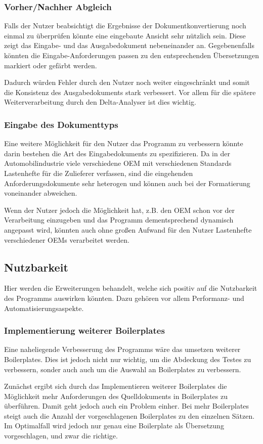 \documentclass[12pt]{report}
\begin{document}
\subsubsection{Vorher/Nachher Abgleich}
Falls der Nutzer beabsichtigt die Ergebnisse der Dokumentkonvertierung noch einmal zu überprüfen könnte eine eingebaute Ansicht sehr nützlich sein. Diese zeigt das Eingabe- und das Ausgabedokument nebeneinander an. Gegebenenfalls könnten die Eingabe-Anforderungen passen zu den entsprechenden Übersetzungen markiert oder gefärbt werden. 

Dadurch würden Fehler durch den Nutzer noch weiter eingeschränkt und somit die Konsistenz des Ausgabedokuments stark verbessert. Vor allem für die spätere Weiterverarbeitung durch den Delta-Analyser ist dies wichtig. 

\subsubsection{Eingabe des Dokumenttyps}
Eine weitere Möglichkeit für den Nutzer das Programm zu verbessern könnte darin bestehen die Art des Eingabedokuments zu spezifizieren. Da in der Automobilindustrie viele verschiedene OEM mit verschiedenen Standards Lastenhefte für die Zulieferer verfassen, sind die eingehenden Anforderungsdokumente sehr heterogen und können auch bei der Formatierung voneinander abweichen. 

Wenn der Nutzer jedoch die Möglichkeit hat, z.B. den OEM schon vor der Verarbeitung einzugeben und das Programm dementsprechend dynamisch angepasst wird, könnten auch ohne großen Aufwand für den Nutzer Lastenhefte verschiedener OEMs verarbeitet werden. 

\subsection{Nutzbarkeit}
Hier werden die Erweiterungen behandelt, welche sich positiv auf die Nutzbarkeit des Programms auswirken könnten. Dazu gehören vor allem Performanz- und Automatisierungsaspekte.
\subsubsection{Implementierung weiterer Boilerplates}
Eine naheliegende Verbesserung des Programms wäre das umsetzen weiterer Boilerplates. Dies ist jedoch nicht nur wichtig, um die Abdeckung des Testes zu verbessern, sonder auch auch um die Auswahl an Boilerplates zu verbessern. 

Zunächst ergibt sich durch das Implementieren weiterer Boilerplates die Möglichkeit mehr Anforderungen des Quelldokuments in Boilerplates zu überführen. Damit geht jedoch auch ein Problem einher. Bei mehr Boilerplates steigt auch die Anzahl der vorgeschlagenen Boilerplates zu den einzelnen Sätzen. Im Optimalfall wird jedoch nur genau eine Boilerplate als Übersetzung vorgeschlagen, und zwar die richtige. 
\end{document}
